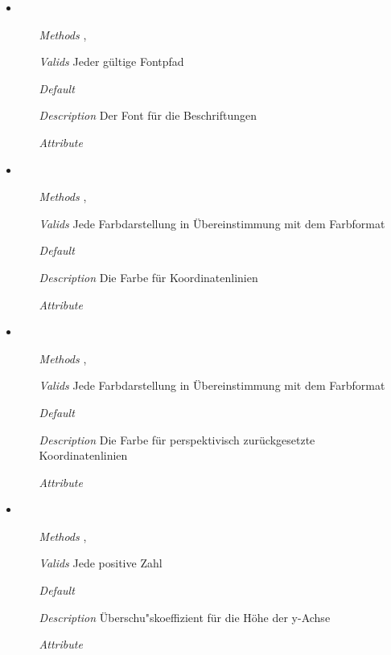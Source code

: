 \begin{itemize}
\item {}
\begin{enumerate}
\item[\textit{Methods}] , 
\item[\textit{Valids}] Jeder g\"ultige Fontpfad
\item[\textit{Default}] 
\item[\textit{Description}] Der Font f\"ur die Beschriftungen
\item[\textit{Attribute}] 
\end{enumerate}

\item {}
\begin{enumerate}
\item[\textit{Methods}] , 
\item[\textit{Valids}] Jede Farbdarstellung in \"Ubereinstimmung mit
  dem Farbformat
\item[\textit{Default}] 
\item[\textit{Description}] Die Farbe f\"ur Koordinatenlinien
\item[\textit{Attribute}] 
\end{enumerate}

\item {}
\begin{enumerate}
\item[\textit{Methods}] , 
\item[\textit{Valids}] Jede Farbdarstellung in \"Ubereinstimmung mit
  dem Farbformat
\item[\textit{Default}] 
\item[\textit{Description}] Die Farbe f\"ur perspektivisch
  zur\"uckgesetzte Koordinatenlinien
\item[\textit{Attribute}] 
\end{enumerate}

\item {}
\begin{enumerate}
\item[\textit{Methods}] ,
\item[\textit{Valids}] Jede positive Zahl
\item[\textit{Default}] 
\item[\textit{Description}] \"Uberschu"skoeffizient f\"ur die H\"ohe
  der y-Achse
\item[\textit{Attribute}] 
\end{enumerate}


\end{itemize}
